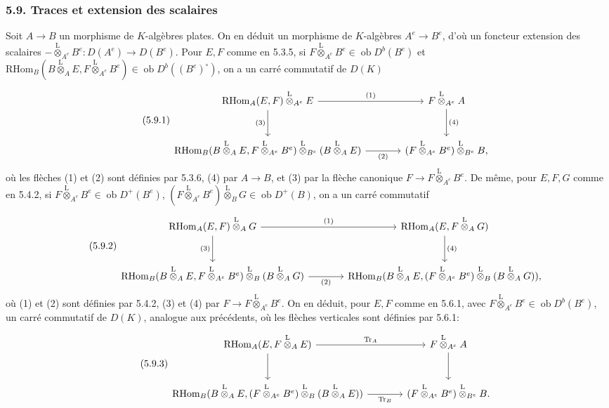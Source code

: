\documentclass[11pt]{article}
\newcommand{\ob}{\operatorname{ob}}
\providecommand{\RHom}{\mathrm{RHom}}
\providecommand{\Tr}{\operatorname{Tr}}
\providecommand{\Tr}{\operatorname{Tr}}
\providecommand{\lten}{\overset{\mathrm L}{\otimes}}
\providecommand{\Tr}{\operatorname{Tr}}
\providecommand{\RHom}{\mathrm{RHom}}
\providecommand{\ob}{\operatorname{ob}}
\providecommand{\lten}{\overset{\mathrm L}{\otimes}}
\providecommand{\RHom}{\mathrm R\mathcal{H}om}
\providecommand{\lten}{\overset{\mathrm L}{\otimes}}
\providecommand{\Tr}{\operatorname{Tr}}
\providecommand{\lten}{\overset{\mathrm L}{\otimes}}
\providecommand{\lten}{\overset{\mathrm L}{\otimes}}
\providecommand{\lten}{\overset{\mathrm L}{\otimes}}
\begin{document}
\subsubsection*{5.9. Traces et extension des scalaires}

Soit $A\to B$ un morphisme de $K$-algèbres plates. On en déduit un morphisme de $K$-algèbres $A^e\to B^e$, d'où un foncteur extension des scalaires $-\lten_{A^e}B^e:D(A^e)\to D(B^e)$. Pour $E,F$ comme en 5.3.5, si $F\lten_{A^e}B^e\in\ob D^b(B^e)$ et $\RHom_B(B\lten_AE,F\lten_{A^e}B^e)\in\ob D^b((B^e)^\circ)$, on a un carré commutatif de $D(K)$
\begin{equation}\tag{5.9.1}
\begin{tikzcd}[column sep=large,row sep=large]
\RHom_A(E,F)\lten_{A^e}E \arrow[r,"(1)"] \arrow[d,"(3)"'] & F\lten_{A^e}A \arrow[d,"(4)"]\\
\RHom_B(B\lten_AE,F\lten_{A^e}B^e)\lten_{B^e}(B\lten_AE) \arrow[r,"(2)"'] & (F\lten_{A^e}B^e)\lten_{B^e}B,
\end{tikzcd}
\end{equation}
où les flèches (1) et (2) sont définies par 5.3.6, (4) par $A\to B$, et (3) par la flèche canonique $F\to F\lten_{A^e}B^e$. De même, pour $E,F,G$ comme en 5.4.2, si $F\lten_{A^e}B^e\in\ob D^+(B^e)$, $(F\lten_{A^e}B^e)\lten_BG\in\ob D^+(B)$, on a un carré commutatif
\begin{equation}\tag{5.9.2}
\begin{tikzcd}[column sep=large,row sep=large]
\RHom_A(E,F)\lten_AG \arrow[r,"(1)"] \arrow[d,"(3)"'] & \RHom_A(E,F\lten_AG) \arrow[d,"(4)"]\\
\RHom_B(B\lten_AE,F\lten_{A^e}B^e)\lten_B(B\lten_AG) \arrow[r,"(2)"'] & \RHom_B(B\lten_AE,(F\lten_{A^e}B^e)\lten_B(B\lten_AG)),
\end{tikzcd}
\end{equation}
où (1) et (2) sont définies par 5.4.2, (3) et (4) par $F\to F\lten_{A^e}B^e$. On en déduit, pour $E,F$ comme en 5.6.1, avec $F\lten_{A^e}B^e\in\ob D^b(B^e)$, un carré commutatif de $D(K)$, analogue aux précédents, où les flèches verticales sont définies par 5.6.1:
\begin{equation}\tag{5.9.3}
\begin{tikzcd}[column sep=large,row sep=large]
\RHom_A(E,F\lten_AE) \arrow[r,"\Tr_A"] \arrow[d] & F\lten_{A^e}A \arrow[d]\\
\RHom_B(B\lten_AE,(F\lten_{A^e}B^e)\lten_B(B\lten_AE)) \arrow[r,"\Tr_B"'] & (F\lten_{A^e}B^e)\lten_{B^e}B.
\end{tikzcd}
\end{equation}
\end{document}
